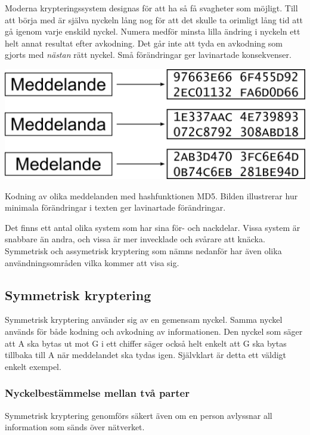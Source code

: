 \documentclass{article}
\begin{document}
Moderna krypteringssystem designas för att ha så få svagheter som möjligt. Till att börja med är själva nyckeln lång nog för att det skulle ta orimligt lång tid att gå igenom varje enskild nyckel. Numera medför minsta lilla ändring i nyckeln ett helt annat resultat efter avkodning. Det går inte att tyda en avkodning som gjorts med \emph{nästan} rätt nyckel. Små förändringar ger lavinartade konsekvenser. \newline

\begin{center}
\includegraphics[width=\textwidth]{avalanche}

Kodning av olika meddelanden med hashfunktionen MD5. Bilden illustrerar hur minimala förändringar i texten ger lavinartade förändringar.
\end{center}

\noindent Det finns ett antal olika system som har sina för- och nackdelar. Vissa system är snabbare än andra, och vissa är mer invecklade och svårare att knäcka. Symmetrisk och assymetrisk kryptering som nämns nedanför har även olika användningsområden vilka kommer att visa sig.

	\subsection {Symmetrisk kryptering}
	
	Symmetrisk kryptering använder sig av en gemensam nyckel. Samma nyckel används för både kodning och avkodning av informationen. Den nyckel som säger att A ska bytas ut mot G i ett chiffer säger också helt enkelt att G ska bytas tillbaka till A när meddelandet ska tydas igen. Självklart är detta ett väldigt enkelt exempel.

		\subsubsection {Nyckelbestämmelse mellan två parter}

		Symmetrisk kryptering genomförs säkert även om en person avlyssnar all information som sänds över nätverket.
\end{document}
